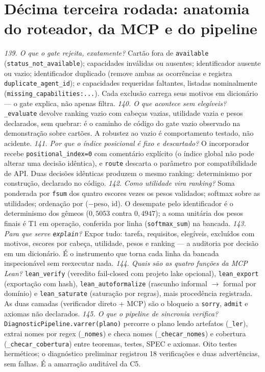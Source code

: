 \section{Décima terceira rodada: anatomia do roteador, da MCP e do pipeline}
\textit{139. O que o gate rejeita, exatamente?} Cartão fora de \texttt{available} (\texttt{status\_not\_available}); capacidades inválidas ou ausentes; identificador ausente ou vazio; identificador duplicado (remove ambas as ocorrências e registra \texttt{duplicate\_agent\_id}); e capacidades requeridas faltantes, listadas nominalmente (\texttt{missing\_capabilities:...}). Cada exclusão carrega seus motivos em dicionário --- o gate explica, não apenas filtra.
\textit{140. O que acontece sem elegíveis?} \texttt{\_evaluate} devolve ranking vazio com cabeças vazias, utilidade vazia e pesos declarados, sem quebrar: é o caminho de código do gate vazio observado na demonstração sobre cartões. A robustez ao vazio é comportamento testado, não acidente.
\textit{141. Por que o índice posicional é fixo e descartado?} O incorporador recebe \texttt{positional\_index=0} com comentário explícito (o índice global não pode alterar uma decisão idêntica), e \texttt{route} descarta o parâmetro por compatibilidade de API. Duas decisões idênticas produzem o mesmo ranking: determinismo por construção, declarado no código.
\textit{142. Como utilidade vira ranking?} Soma ponderada por \texttt{fsum} dos quatro escores vezes os pesos validados; softmax sobre as utilidades; ordenação por ($-\mathrm{peso}$, $\mathrm{id}$). O desempate pelo identificador é o determinismo dos gêmeos ($0{,}5053$ contra $0{,}4947$); a soma unitária dos pesos finais é T1 em operação, conferida por linha (\texttt{softmax\_sum}) na bancada.
\textit{143. Para que serve \texttt{explain}?} Expor tudo: tarefa, requisitos, elegíveis, excluídos com motivos, escores por cabeça, utilidade, pesos e ranking --- a auditoria por decisão em um dicionário. É o instrumento que torna cada linha da bancada inspecionável sem reexecutar nada.
\textit{144. Quais são as quatro funções da MCP Lean?} \texttt{lean\_verify} (veredito fail-closed com projeto lake opcional), \texttt{lean\_export} (exportação com hash), \texttt{lean\_autoformalize} (rascunho informal $\to$ formal por domínio) e \texttt{lean\_saturate} (saturação por regras), mais procedência registrada. As duas camadas (verificador direto + MCP) são o bloqueio a \texttt{sorry}, \texttt{admit} e axiomas não declarados.
\textit{145. O que o pipeline de sincronia verifica?} \texttt{DiagnosticPipeline.varrer(plano)} percorre o plano lendo artefatos (\texttt{\_ler}), extrai nomes por regex (\texttt{\_nomes}) e checa nomes (\texttt{\_checar\_nomes}) e cobertura (\texttt{\_checar\_cobertura}) entre teoremas, testes, SPEC e axiomas. Oito testes herméticos; o diagnóstico preliminar registrou 18 verificações e duas advertências, sem falhas. É a amarração auditável da C5.
